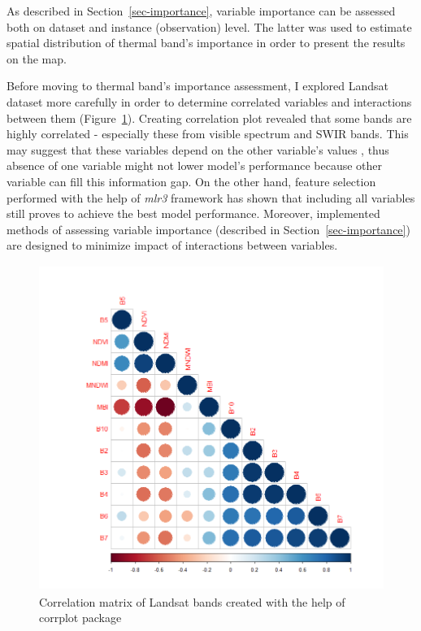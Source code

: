 \documentclass{amuthesis}
\begin{document}
As described in Section~\ref{sec-importance}, variable importance can be
assessed both on dataset and instance (observation) level. The latter
was used to estimate spatial distribution of thermal band's importance
in order to present the results on the map.

Before moving to thermal band's importance assessment, I explored
Landsat dataset more carefully in order to determine correlated
variables and interactions between them (Figure~\ref{fig-rycina19}).
Creating correlation plot revealed that some bands are highly correlated
- especially these from visible spectrum and SWIR bands. This may
suggest that these variables depend on the other variable's values
\autocite{biecek_explanatory_2021}, thus absence of one variable might
not lower model's performance because other variable can fill this
information gap. On the other hand, feature selection performed with the
help of \emph{mlr3} framework \autocite{R-mlr3} has shown that including
all variables still proves to achieve the best model performance.
Moreover, implemented methods of assessing variable importance
(described in Section~\ref{sec-importance}) are designed to minimize
impact of interactions between variables.

\begin{figure}[H]

{\centering \includegraphics[width=4.45833in,height=4.16667in]{./figures/corrplot.png}

}

\caption{\label{fig-rycina19}Correlation matrix of Landsat bands created
with the help of corrplot package}

\end{figure}
\end{document}
